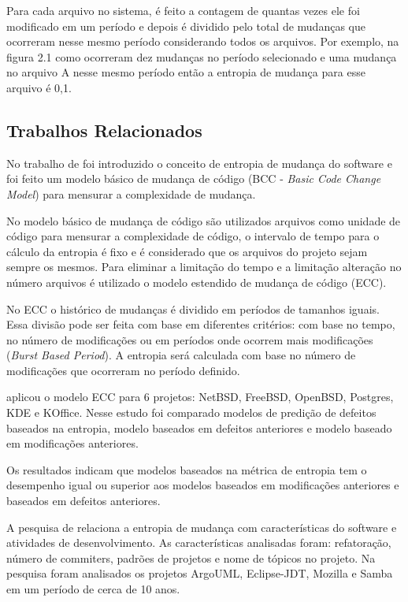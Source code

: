 Para cada arquivo no sistema, é feito a contagem de quantas vezes ele foi modificado em um período e depois é dividido pelo total de mudanças que ocorreram nesse mesmo período considerando todos os arquivos. Por exemplo, na figura 2.1 como ocorreram dez mudanças no período selecionado e uma mudança no arquivo A nesse mesmo período então a entropia de mudança para esse arquivo é 0,1.

\subsection{Trabalhos Relacionados}
No trabalho de  foi introduzido o conceito de entropia de mudança do software e foi feito um modelo básico de mudança de código (BCC - \textit{Basic Code Change Model}) para mensurar a complexidade de mudança.

No modelo básico de mudança de código são utilizados arquivos como unidade de código para mensurar a complexidade de código, o intervalo de tempo para o cálculo da entropia é fixo e é considerado que os arquivos do projeto sejam sempre os mesmos. Para eliminar a limitação do tempo e a limitação alteração no número arquivos é utilizado o modelo estendido de mudança de código (ECC).

No ECC o histórico de mudanças é dividido em períodos de tamanhos iguais. Essa divisão pode ser feita com base em diferentes critérios: com base no tempo, no número de modificações ou em períodos onde ocorrem mais modificações (\textit{Burst Based Period}). A entropia será calculada com base no número de modificações que ocorreram no período definido.

 aplicou o modelo ECC para 6 projetos: NetBSD, FreeBSD, OpenBSD, Postgres, KDE e KOffice. Nesse estudo foi comparado modelos de predição de defeitos baseados na entropia, modelo baseados em defeitos anteriores e modelo baseado em modificações anteriores.

Os resultados indicam que modelos baseados na métrica de entropia tem o desempenho igual ou superior aos modelos baseados em modificações anteriores e baseados em defeitos anteriores.

A pesquisa de  relaciona a entropia de mudança com características do software e atividades de desenvolvimento. As características analisadas foram: refatoração, número de commiters, padrões de projetos e nome de tópicos no projeto. Na pesquisa foram analisados os projetos ArgoUML, Eclipse-JDT, Mozilla e Samba em um período de cerca de 10 anos.


